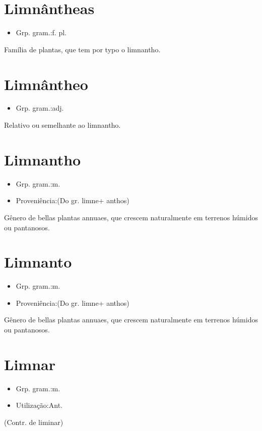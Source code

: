 \section{Limnântheas}
\begin{itemize}
\item {Grp. gram.:f. pl.}
\end{itemize}
Família de plantas, que tem por typo o limnantho.
\section{Limnântheo}
\begin{itemize}
\item {Grp. gram.:adj.}
\end{itemize}
Relativo ou semelhante ao limnantho.
\section{Limnantho}
\begin{itemize}
\item {Grp. gram.:m.}
\end{itemize}
\begin{itemize}
\item {Proveniência:(Do gr. \textunderscore limne\textunderscore  + \textunderscore anthos\textunderscore )}
\end{itemize}
Gênero de bellas plantas annuaes, que crescem naturalmente em terrenos húmidos ou pantanosos.
\section{Limnanto}
\begin{itemize}
\item {Grp. gram.:m.}
\end{itemize}
\begin{itemize}
\item {Proveniência:(Do gr. \textunderscore limne\textunderscore  + \textunderscore anthos\textunderscore )}
\end{itemize}
Gênero de bellas plantas annuaes, que crescem naturalmente em terrenos húmidos ou pantanosos.
\section{Limnar}
\begin{itemize}
\item {Grp. gram.:m.}
\end{itemize}
\begin{itemize}
\item {Utilização:Ant.}
\end{itemize}
(Contr. de \textunderscore liminar\textunderscore )
